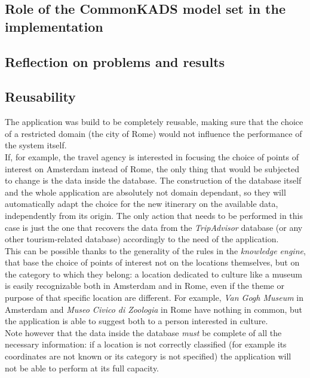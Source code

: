 \documentclass[11pt]{article} %
\begin{document}
\subsection{Role of the CommonKADS model set in the implementation} \label{sec:common}
\subsection{Reflection on problems and results}
\subsection{Reusability} \label{sec:reusability}
The application was build to be completely reusable, making sure that the choice of a restricted domain (the city of Rome) would not influence the performance of the system itself.\\
\indent If, for example, the travel agency is interested in focusing the choice of points of interest on Amsterdam instead of Rome, the only thing that would be subjected to change is the data inside the database. The construction of the database itself and the whole application are absolutely not domain dependant, so they will automatically adapt the choice for the new itinerary on the available data, independently from its origin. The only action that needs to be performed in this case is just the one that recovers the data from the \textit{TripAdvisor} database (or any other tourism-related database) accordingly to the need of the application.\\
\indent This can be possible thanks to the generality of the rules in the \textit{knowledge engine}, that base the choice of points of interest not on the locations themselves, but on the category to which they belong: a location dedicated to culture like a museum is easily recognizable both in Amsterdam and in Rome, even if the theme or purpose of that specific location are different. For example, \textit{Van Gogh Museum} in Amsterdam and \textit{Museo Civico di Zoologia} in Rome have nothing in common, but the application is able to suggest both to a person interested in culture.\\
\indent Note however that the data inside the database \textit{must} be complete of all the necessary information: if a location is not correctly classified (for example its coordinates are not known or its category is not specified) the application will not be able to perform at its full capacity.

\newpage
\end{document}
